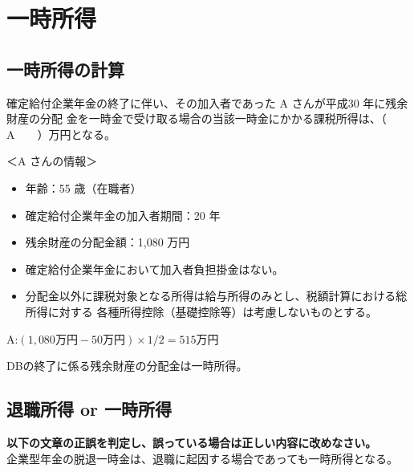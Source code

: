 \section{一時所得}

\subsection{一時所得の計算}

\begin{fillblank}[年金1 2018 問題1(3)\textcircled{3}]
  確定給付企業年金の終了に伴い、その加入者であった A さんが平成30 年に残余財産の分配
金を一時金で受け取る場合の当該一時金にかかる課税所得は、（　　A　　）万円となる。

＜A さんの情報＞
\begin{itemize}
  \item 年齢：55 歳（在職者）
\item 確定給付企業年金の加入者期間：20 年
\item 残余財産の分配金額：1,080 万円
\item 確定給付企業年金において加入者負担掛金はない。
\item 分配金以外に課税対象となる所得は給与所得のみとし、税額計算における総所得に対する
各種所得控除（基礎控除等）は考慮しないものとする。
\end{itemize}

\end{fillblank}

\begin{answerbox}
  A:$(1,080万円 - 50万円) \times 1/2 = 515万円$
\end{answerbox}

\begin{explanationbox}
  DBの終了に係る残余財産の分配金は一時所得。
\end{explanationbox}

\newpage

\subsection{退職所得 or 一時所得}

\begin{truefalse}[年金1 2018 問題2(3)\textcircled{3}]
         \textbf{以下の文章の正誤を判定し、誤っている場合は正しい内容に改めなさい。}
\\  


  企業型年金の脱退一時金は、退職に起因する場合であっても一時所得となる。
\end{truefalse}

